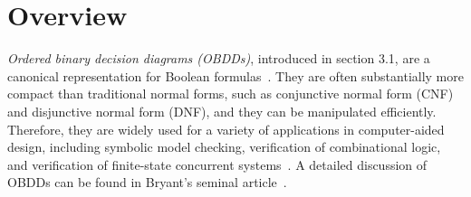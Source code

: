 \section{Overview}
\label{sec:OBDDs}

{\it Ordered binary decision diagrams (OBDDs)}, introduced in section 3.1, are a canonical 
representation for Boolean formulas~\cite{Bryant:BDD}. They are often
substantially more compact than traditional normal forms, such as
conjunctive normal form (CNF) and disjunctive normal form (DNF), and
they can be manipulated efficiently. Therefore, they are widely used for a
variety of applications in computer-aided design, including symbolic
model checking, verification of combinational logic, and verification of
finite-state concurrent systems~\cite{Clarke:book}.  A detailed
discussion of OBDDs can be found in Bryant's seminal
article~\cite{Bryant:BDD}.


